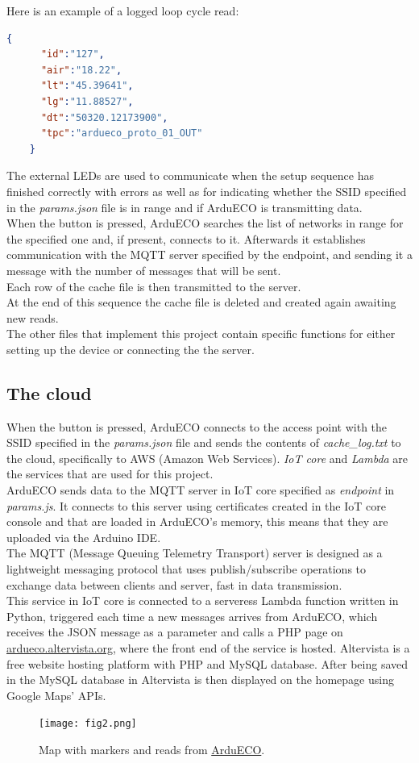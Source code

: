 \documentclass[conference]{IEEEtran}
\begin{document}
		Here is an example of a logged loop cycle read:
		\begin{lstlisting}[language=json,firstnumber=1]		
    {
	  "id":"127",
	  "air":"18.22",
	  "lt":"45.39641",
	  "lg":"11.88527",
	  "dt":"50320.12173900",
	  "tpc":"ardueco_proto_01_OUT"
    }
		\end{lstlisting}	
		The external LEDs are used to communicate when the setup sequence has finished correctly with errors as well as for indicating whether the SSID specified in the \textit{params.json} file is in range and if ArduECO is transmitting data.\\
		When the button is pressed, ArduECO searches the list of networks in range for the specified one and, if present, connects to it.
		Afterwards it establishes communication with the MQTT server specified by the endpoint, and sending it a message with the number of messages that will be sent.\\
		Each row of the cache file is then transmitted to the server.\\
		At the end of this sequence the cache file is deleted and created again awaiting new reads.\\
		The other files that implement this project contain specific functions for either setting up the device or connecting the the server.
		
	\subsection{The cloud}
	
		When the button is pressed, ArduECO connects to the access point with the SSID specified in the \textit{params.json} file and sends the contents of \textit{cache\_log.txt} to the cloud, specifically to AWS (Amazon Web Services).
		\textit{IoT core} and \textit{Lambda} are the services that are used for this project.\\
		ArduECO sends data to the MQTT server in IoT core specified as \textit{endpoint} in \textit{params.js}.
		It connects to this server using certificates created in the IoT core console and that are loaded in ArduECO's memory, this means that they are uploaded via the Arduino IDE.\\
		The MQTT (Message Queuing Telemetry Transport) server is designed as a lightweight messaging protocol that uses publish/subscribe operations to exchange data between clients and server, fast in data transmission\cite{mqtt}.\\
		This service in IoT core is connected to a serveress Lambda function written in Python, triggered each time a new messages arrives from ArduECO, which receives the JSON message as a parameter and calls a PHP page on \href{ardueco.altervista.org}{ardueco.altervista.org}, where the front end of the service is hosted.
		Altervista is a free website hosting platform with PHP and MySQL database.
		After being saved in the MySQL database in Altervista is then displayed on the homepage using Google Maps' APIs.
		\begin{figure}[htbp]
			\centerline{\texttt{[image: fig2.png]}}
			\caption{Map with markers and reads from \href{ardueco.altervista.org}{ArduECO}.}
			\label{altervista}
		\end{figure}
	
\end{document}
